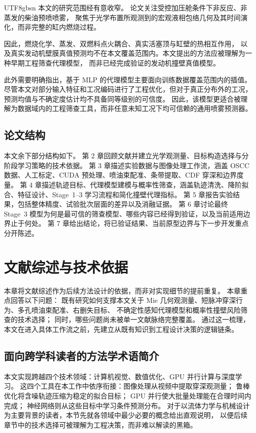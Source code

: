 \documentclass[english, 12pt, a4paper, elec, utf8, a-2b, online]{aaltothesis}
\begin{document}
\begin{CJK*}{UTF8}{gbsn}
本文的研究范围经有意收窄。
论文关注受控加压舱条件下非反应、非蒸发的柴油预喷喷雾，
聚焦于光学布置所观测到的宏观液相包络几何及其时间演化，而非完整的缸内燃烧过程。

因此，燃烧化学、蒸发、双燃料点火耦合、真实活塞顶与缸壁的热相互作用，
以及真实发动机壁膜真值预测均不在本文覆盖范围内。本文提出的方法应被理解为一种早期工程筛查代理模型，
而非已经完成验证的发动机撞壁真值模型。

此外需要明确指出，基于 MLP 的代理模型主要面向训练数据覆盖范围内的插值。
尽管本文对部分输入特征和工况编码进行了工程优化，但对于真正分布外的工况，预测均值与不确定度估计均不具备同等级别的可信度。
因此，该模型更适合被理解为数据域内的工程筛查工具，而非任意未知工况下均可信赖的通用喷雾预测器。

\subsection{论文结构}

本文余下部分结构如下。
第 2 章回顾文献并建立光学观测量、目标构造选择与分阶段学习策略的技术依据。
第 3 章描述实验数据与图像处理工作流，涵盖 OSCC 数据、人工标定、CUDA 预处理、喷油束配准、条带提取、CDF 穿深和边界度量。
第 4 章描述轨迹目标、代理模型建模与概率性筛查，涵盖轨迹清洗、降阶拟合、特征设计、Stage~1--3 学习流程和简化撞壁代理指标。
第 5 章报告实验结果，包括整体精度、试验批次层面的差异以及消融证据。
第 6 章讨论最终 Stage~3 模型为何是最可信的筛查模型、哪些内容已经得到验证，以及当前适用边界止于何处。
第 7 章给出结论，将已验证结果、当前原型边界与下一步开发重点分开陈述。

\section{文献综述与技术依据}

本章将文献综述作为后续方法设计的依据，而非对实现细节的提前重复。
本章重点回答以下问题：
既有研究如何支撑本文关于 Mie 几何观测量、短脉冲穿深行为、多孔喷油束配准、右删失目标、
不确定性感知代理模型和概率性撞壁风险筛查的技术选择；
同时，哪些问题尚未被单一文献脉络完整覆盖。
通过这一梳理，本文在进入具体工作流之前，先建立从既有知识到工程设计决策的逻辑链条。

\subsection{面向跨学科读者的方法学术语简介}\label{sec:methods-terminology}

本文实现跨越四个技术领域：计算机视觉、数值优化、GPU 并行计算与深度学习。
这四个工具在本工作中依序衔接：图像处理从视频中提取穿深观测量；
鲁棒优化将含噪轨迹压缩为稳定的拟合目标；
GPU 并行使大批量处理能在合理时间内完成；
神经网络则从这些目标中学习条件预测分布。
对于以流体力学与机械设计为主要背景的读者，本节先就各领域中最少必要的概念给出直观说明，
以便后续章节中的技术选择可被理解为工程决策，而非难以解读的黑箱。


\end{CJK*}
\end{document}
